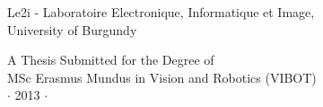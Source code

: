 \vspace{1cm}
\begin{center}
\normalsize{
Le2i - Laboratoire Electronique, Informatique et Image, \\
University of Burgundy}
\end{center}



\vspace{3.5cm}
\begin{center}
{\large A Thesis Submitted for the Degree of \\MSc Erasmus Mundus
in Vision and Robotics (VIBOT) \\\vspace{0.3cm} $\cdot$ 2013
$\cdot$}
\end{center}
\singlespacing










